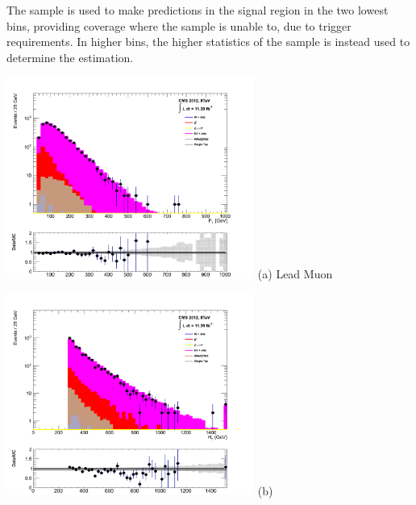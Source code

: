 \begin{itemize}
The \dimupjets sample is used to make predictions in the signal region in the two lowest \theht bins, providing coverage where the \gpjets sample is unable to, due to trigger requirements. In higher \theht bins, the higher statistics of the \gpjets sample is instead used to determine the \zinv estimation.

\begin{minipage}{\linewidth}
\centering
\begin{minipage}{.48\textwidth}
\centering
\includegraphics[width = 3.2in]{plots/dimuon_leadmu_datamc.pdf}
(a) Lead Muon \pt
\end{minipage}
\begin{minipage}{.48\textwidth}
\centering
\includegraphics[width = 3.2in]{plots/dimuon_ht_datamc.pdf}
(b) \theht
\end{minipage}
\end{minipage}

\xspace


\end{itemize}
